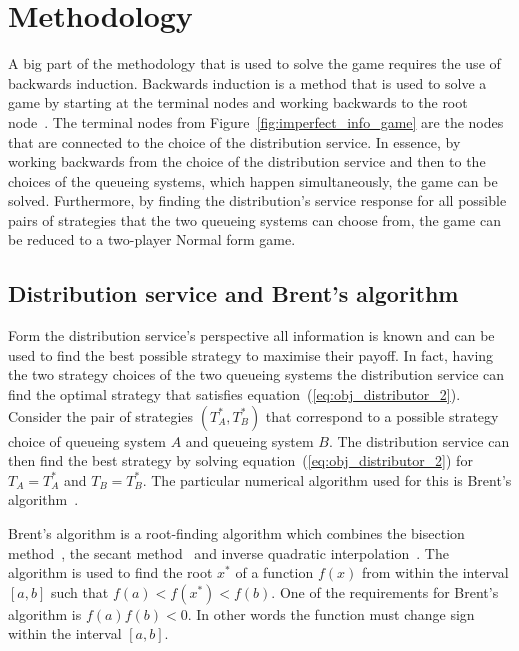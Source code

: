 \section{Methodology}\label{sec:game_methodology}

A big part of the methodology that is used to solve the game requires the use of
backwards induction.
Backwards induction is a method that is used to solve a game by starting at the
terminal nodes and working backwards to the root node~\cite{watson2002strategy}.
The terminal nodes from Figure~\ref{fig:imperfect_info_game} are the nodes that
are connected to the choice of the distribution service.
In essence, by working backwards from the choice of the distribution service
and then to the choices of the queueing systems, which happen simultaneously,
the game can be solved.
Furthermore, by finding the distribution's service response for all possible
pairs of strategies that the two queueing systems can choose from, the game can
be reduced to a two-player Normal form game.


\subsection{Distribution service and Brent's algorithm}
\label{sec:best_response_distribution_service}

Form the distribution service's perspective all information is known and can be
used to find the best possible strategy to maximise their payoff.
In fact, having the two strategy choices of the two queueing systems the
distribution service can find the optimal strategy that satisfies
equation~(\ref{eq:obj_distributor_2}).
Consider the pair of strategies \((T_A^*, T_B^*)\) that correspond to a possible
strategy choice of queueing system \(A\) and queueing system \(B\).
The distribution service can then find the best strategy by solving
equation~(\ref{eq:obj_distributor_2}) for \(T_A = T_A^*\) and \(T_B = T_B^*\).
The particular numerical algorithm used for this is Brent's
algorithm~\cite{brent_method}.

Brent's algorithm is a root-finding algorithm which combines the bisection
method~\cite{corliss1977root}, the secant method~\cite{secantmethod} and
inverse quadratic interpolation~\cite{epperson2021introduction}.
The algorithm is used to find the root \(x^*\) of a function \(f(x)\) from
within the interval \([a, b]\) such that \(f(a) < f(x^*) < f(b)\).
One of the requirements for Brent's algorithm is \(f(a)f(b) < 0\).
In other words the function must change sign within the interval \([a, b]\).

